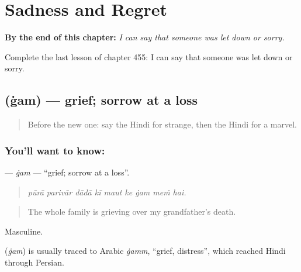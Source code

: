 
\chapter{Sadness and Regret}
\label{ch:hi-sadness-and-regret}

\begin{chapteropening}
\textbf{By the end of this chapter:} \emph{I can say that someone was let down or sorry.}

Complete the last lesson of chapter 455: I can say that someone was let down or sorry.
\end{chapteropening}

\section[\texorpdfstring{\hi{ग़म} (ġam)}{ग़म (ġam)}]{ (ġam) — grief; sorrow at a loss}

\label{lesson:HI-C455-gam}



\begin{quote}
Before the new one: say the Hindi for strange, then the Hindi for a marvel.
\end{quote}

\subsection*{You'll want to know: }
\textbf{} — \emph{ġam} — \textquotedblleft{}grief; sorrow at a loss\textquotedblright{}.

\begin{quote}
        
\end{quote}

\begin{quote}
\emph{pūrā parivār dādā kī maut ke ġam meṁ hai.}
\end{quote}

\begin{quote}
The whole family is grieving over my grandfather's death.
\end{quote}

Masculine.

\begin{cousinweb}
\textbf{} (\emph{ġam}) is usually traced to Arabic \emph{ġamm}, \textquotedblleft{}grief, distress\textquotedblright{}, which reached Hindi through Persian.
\end{cousinweb}

